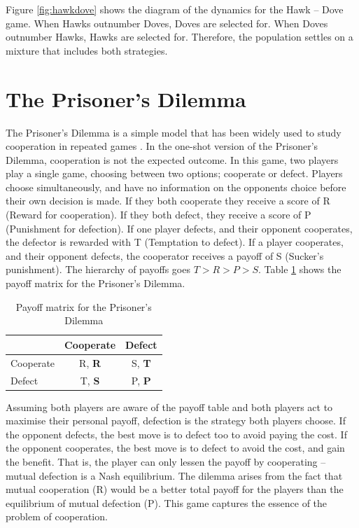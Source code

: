 \documentclass[a4paper,11pt,bcshonoursthesis,singlespace,oneside,thesisdraft,pdflatex]{cssethesis}
\begin{document}
Figure \ref{fig:hawkdove} shows the diagram of the dynamics for the Hawk -- Dove game. 
When Hawks outnumber Doves, Doves are selected for. 
When Doves outnumber Hawks, Hawks are selected for. 
Therefore, the population settles on a mixture that includes both strategies. 

\section{The Prisoner's Dilemma}
\label{sec:prisoners}
The Prisoner's Dilemma is a simple model that has been widely used to study cooperation in repeated games \citep{Axelrod1997}. 
In the one-shot version of the Prisoner's Dilemma, cooperation is not the expected outcome. 
In this game, two players play a single game, choosing between two options; cooperate or defect. 
Players choose simultaneously, and have no information on the opponents choice before their own decision is made. 
If they both cooperate they receive a score of R (Reward for cooperation). 
If they both defect, they receive a score of P (Punishment for defection). 
If one player defects, and their opponent cooperates, the defector is rewarded with T (Temptation to defect). 
If a player cooperates, and their opponent defects, the cooperator receives a payoff of S (Sucker's punishment). 
The hierarchy of payoffs goes $T>R>P>S$. Table \ref{table:payoffs} shows the payoff matrix for the Prisoner's Dilemma. 
\begin{table}[h]\centering
\captionsetup{justification=centering}
\begin{tabular}{|l|c|c|}
\hline
 & \bf{Cooperate} & \bf{Defect}\\
\hline
Cooperate & R, \bf{R} & S, \bf{T}\\
\hline
Defect & T, \bf{S}  & P, \bf{P} \\
\hline
\end{tabular}
\caption{Payoff matrix for the Prisoner's Dilemma}
\label{table:payoffs}
\end{table}

Assuming both players are aware of the payoff table and both players act to maximise their personal payoff, defection is the strategy both players choose. 
If the opponent defects, the best move is to defect too to avoid paying the cost. 
If the opponent cooperates, the best move is to defect to avoid the cost, and gain the benefit. 
That is, the player can only lessen the payoff by cooperating -- mutual defection is a Nash equilibrium. 
The dilemma arises from the fact that mutual cooperation (R) would be a better total payoff for the players than the equilibrium of mutual defection (P). 
This game captures the essence of the problem of cooperation.
\end{document}
